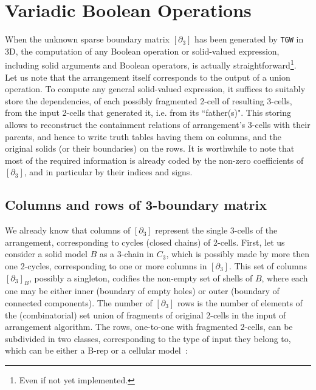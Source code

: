 \documentclass{juliacon}
\begin{document}
\section{Variadic Boolean Operations}

When the unknown sparse boundary matrix $[\partial_3]$ has been generated by \texttt{TGW} in 3D, the computation of any Boolean operation or solid-valued expression, including solid arguments and Boolean operators, is actually straightforward\footnote{Even if not yet implemented.}. Let us note that the arrangement itself corresponds to the output of a union operation.
To compute any general solid-valued expression, it suffices to suitably store the dependencies, of each possibly fragmented 2-cell of resulting 3-cells, from the input 2-cells that generated it, i.e. from its ``father(s)". This storing allows to reconstruct the containment relations of arrangement's 3-cells with their parents, and hence to write truth tables having them on columns, and the original solids (or their boundaries) on the rows.
It is worthwhile to note that most of the required information is already coded by the non-zero coefficients of $[\partial_3]$, and in particular by their indices and signs.


\subsection{Columns and rows of 3-boundary matrix}
We already know that columns of $[\partial_3]$ represent the single 3-cells of the arrangement, corresponding to cycles (closed chains) of 2-cells. 
First, let us consider a solid model $B$ as a 3-chain in $C_3$, which is possibly made by more then one 2-cycles, corresponding to one or more columns in $[\partial_3]$. 
This set of columns $[\partial_3]_B$, possibly a singleton, codifies the non-empty set of shells of $B$, where each one may be either inner (boundary of empty holes) or outer (boundary of connected components).  
The number of $[\partial_3]$ rows is the number of elements of the (combinatorial) set union of fragments of original 2-cells in the input of arrangement algorithm. 
 The rows, one-to-one with fragmented 2-cells, can be subdivided in two classes, corresponding to the type of input they belong to, which can be either a B-rep or a cellular model~\cite{HofShapiro:2017}: 
 
\end{document}
